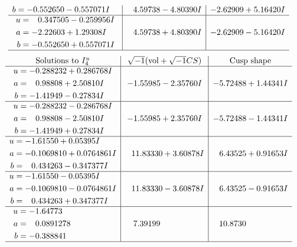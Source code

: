 \documentclass[1p]{elsarticle_modified}
\theoremstyle{definition}
\newcommand{\I}{\sqrt{-1}}
\begin{document}
$$\begin{array}{c|c|c}
\begin{aligned}
b &= -0.552650 - 0.557071 I\end{aligned}
 & \phantom{-}4.59738 - 4.80390 I & -2.62909 + 5.16420 I \\ \hline\begin{aligned}
u &= \phantom{-}0.347505 - 0.259956 I \\
a &= -2.22603 + 1.29308 I \\
b &= -0.552650 + 0.557071 I\end{aligned}
 & \phantom{-}4.59738 + 4.80390 I & -2.62909 - 5.16420 I\\
 \hline 
 \end{array}$$\newpage$$\begin{array}{c|c|c}  
\text{Solutions to }I^u_{4}& \I (\text{vol} + \sqrt{-1}CS) & \text{Cusp shape}\\
 \hline 
\begin{aligned}
u &= -0.288232 + 0.286768 I \\
a &= \phantom{-}0.98808 + 2.50810 I \\
b &= -1.41949 - 0.27834 I\end{aligned}
 & -1.55985 - 2.35760 I & -5.72488 + 1.44341 I \\ \hline\begin{aligned}
u &= -0.288232 - 0.286768 I \\
a &= \phantom{-}0.98808 - 2.50810 I \\
b &= -1.41949 + 0.27834 I\end{aligned}
 & -1.55985 + 2.35760 I & -5.72488 - 1.44341 I \\ \hline\begin{aligned}
u &= -1.61550 + 0.05395 I \\
a &= -0.1069810 + 0.0764861 I \\
b &= \phantom{-}0.434263 - 0.347377 I\end{aligned}
 & \phantom{-}11.83330 + 3.60878 I & \phantom{-}6.43525 + 0.91653 I \\ \hline\begin{aligned}
u &= -1.61550 - 0.05395 I \\
a &= -0.1069810 - 0.0764861 I \\
b &= \phantom{-}0.434263 + 0.347377 I\end{aligned}
 & \phantom{-}11.83330 - 3.60878 I & \phantom{-}6.43525 - 0.91653 I \\ \hline\begin{aligned}
u &= -1.64773\phantom{ +0.000000I} \\
a &= \phantom{-}0.0891278\phantom{ +0.000000I} \\
b &= -0.388841\phantom{ +0.000000I}\end{aligned}
 & \phantom{-}7.39199\phantom{ +0.000000I} & \phantom{-}10.8730\phantom{ +0.000000I}\\
 \hline 
 \end{array}$$\newpage
\end{document}
